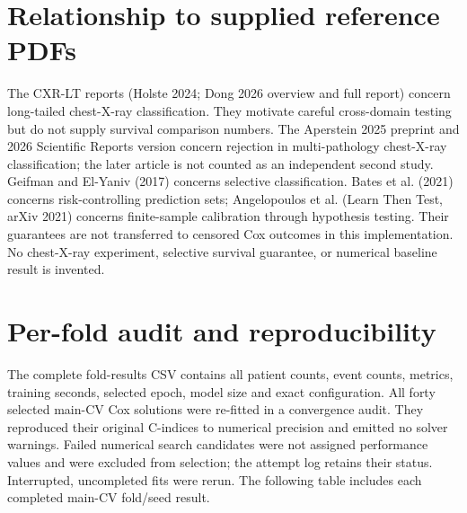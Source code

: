 \documentclass[10pt]{article}
\begin{document}
\section{Relationship to supplied reference PDFs}
The CXR-LT reports (Holste 2024; Dong 2026 overview and full report) concern
long-tailed chest-X-ray classification. They motivate careful cross-domain
testing but do not supply survival comparison numbers. The Aperstein 2025
preprint and 2026 Scientific Reports version concern rejection in
multi-pathology chest-X-ray classification; the later article is not counted
as an independent second study. Geifman and El-Yaniv (2017) concerns selective
classification. Bates et al. (2021) concerns risk-controlling prediction sets;
Angelopoulos et al. (Learn Then Test, arXiv 2021) concerns finite-sample
calibration through hypothesis testing. Their guarantees are not transferred
to censored Cox outcomes in this implementation. No chest-X-ray experiment,
selective survival guarantee, or numerical baseline result is invented.

\section{Per-fold audit and reproducibility}
The complete fold-results CSV contains all patient counts, event counts,
metrics, training seconds, selected epoch, model size and exact configuration.
All forty selected main-CV Cox solutions were re-fitted in a convergence
audit. They reproduced their original C-indices to numerical precision and
emitted no solver warnings. Failed numerical search candidates were not
assigned performance values and were excluded from selection; the attempt
log retains their status. Interrupted, uncompleted fits were rerun.
The following table includes each completed main-CV fold/seed result.
\end{document}
